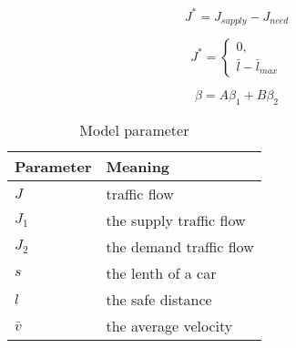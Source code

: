 
\begin{equation}
J^* = J_{supply} - J_{need}
\end{equation}

\[ J^* = \begin{cases}
0,\\
\bar{l} - \bar{l}_{max}
\end{cases}\]



\begin{displaymath}
\beta = A\beta_1 + B\beta_2
\end{displaymath}


\begin{table}
\centering
\begin{tabular}{ll}
\hline
Parameter & Meaning\\
\hline
$J$ & traffic flow\\
$J_1$ & the supply traffic flow \\
$J_2$ & the demand traffic flow \\
$s$ & the lenth of a car \\
$l$ & the safe distance \\
$\bar{v}$ & the average velocity\\
\hline
\end{tabular}
\caption{Model parameter}
\end{table}


